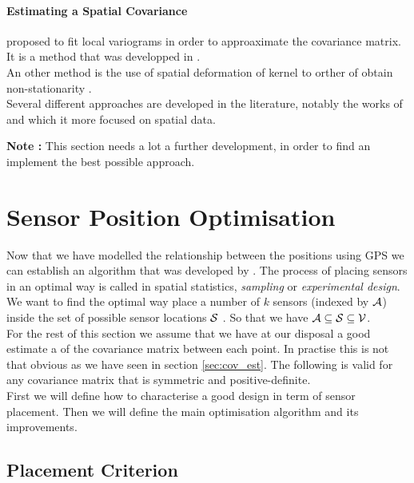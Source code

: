 \documentclass[12pt,twoside]{report}
\begin{document}
\paragraph{Estimating a Spatial Covariance} 

\cite{nott_estimation_2002-1} proposed to fit local variograms in order to approaximate the covariance matrix. It is a method that was developped in \cite{cressie_statistics_1991}. \\

An other method is the use of spatial deformation of kernel to orther of obtain non-stationarity \citep{sampson_nonparametric_1992}. \\

Several different approaches are developed in the literature, notably the works of \citep{fan_overview_2015} and \cite{guttorp_20_1994} which it more focused on spatial data. 

\textbf{Note :} This section needs a lot a further development, in order to find an implement the best possible approach. 

\section{Sensor Position Optimisation}

Now that we have modelled the relationship between the positions using GPS we can establish an algorithm that was developed by \citet{krause_near-optimal_2008}. The process of placing sensors in an optimal way is called in spatial statistics, \textit{sampling} or \textit{experimental design}. We want to find the optimal way place a number of $k$ sensors (indexed by $\A$) inside the set of possible sensor locations $\S$ . So that we have $\A \subseteq \S \subseteq \V$. \\


For the rest of this section we assume that we have at our disposal a good estimate a of the covariance matrix between each point. In practise this is not that obvious as we have seen in section \ref{sec:cov_est}. The following is valid for any covariance matrix that is symmetric and positive-definite. \\ 

First we will define how to characterise a good design in term of sensor placement. Then we will define the main optimisation algorithm and its improvements. \\ 

\subsection{Placement Criterion}
\end{document}
